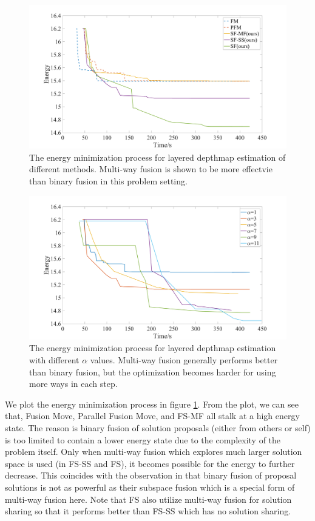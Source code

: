 
\begin{figure}[tb]
  \includegraphics[width=\columnwidth]{figure/layered_depthmap_convergence.png}
  \caption{The energy minimization process for layered depthmap estimation of different methods. Multi-way fusion is shown to be more effectvie than binary fusion in this problem setting.}\label{fig:layered_depthmap_convergence}
\end{figure}
\begin{figure}[tb]
  \includegraphics[width=\columnwidth]{figure/layered_depthmap_by_alpha.png}
  \caption{The energy minimization process for layered depthmap estimation with different $\alpha$ values. Multi-way fusion generally performs better than binary fusion, but the optimization becomes harder for using more ways in each step.}\label{fig:layered_depthmap_by_alpha}
\end{figure}

We plot the energy minimization process in figure \ref{fig:layered_depthmap_convergence}. From the plot, we can see that, Fusion Move, Parallel Fusion Move, and FS-MF all stalk at a high energy state. The reason is binary fusion of solution proposals (either from others or self) is too limited to contain a lower energy state due to the complexity of the problem itself. Only when multi-way fusion which explores much larger solution space is used (in FS-SS and FS), it becomes possible for the energy to further decrease. This coincides with the observation in \cite{layered_depthmap} that binary fusion of proposal solutions is not as powerful as their subspace fusion which is a special form of multi-way fusion here. Note that FS also utilize multi-way fusion for solution sharing so that it performs better than FS-SS which has no solution sharing.

